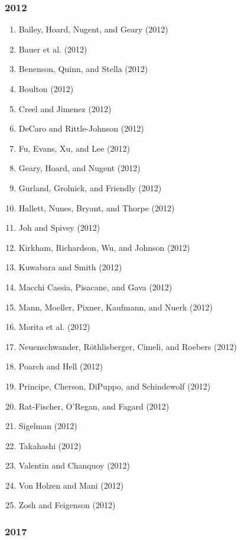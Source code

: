 \documentclass[english,man]{apa6}
\providecommand{\tightlist}{%
  \setlength{\itemsep}{0pt}\setlength{\parskip}{0pt}}
\begin{document}
\subsubsection{2012}\label{section-12}

\begin{enumerate}
\def\labelenumi{\arabic{enumi})}
\tightlist
\item
  Bailey, Hoard, Nugent, and Geary (2012)
\item
  Bauer et al. (2012)
\item
  Benenson, Quinn, and Stella (2012)
\item
  Boulton (2012)
\item
  Creel and Jimenez (2012)
\item
  DeCaro and Rittle-Johnson (2012)
\item
  Fu, Evans, Xu, and Lee (2012)
\item
  Geary, Hoard, and Nugent (2012)
\item
  Gurland, Grolnick, and Friendly (2012)
\item
  Hallett, Nunes, Bryant, and Thorpe (2012)
\item
  Joh and Spivey (2012)
\item
  Kirkham, Richardson, Wu, and Johnson (2012)
\item
  Kuwabara and Smith (2012)
\item
  Macchi Cassia, Pisacane, and Gava (2012)
\item
  Mann, Moeller, Pixner, Kaufmann, and Nuerk (2012)
\item
  Morita et al. (2012)
\item
  Neuenschwander, Röthlisberger, Cimeli, and Roebers (2012)
\item
  Poarch and Hell (2012)
\item
  Principe, Cherson, DiPuppo, and Schindewolf (2012)
\item
  Rat-Fischer, O'Regan, and Fagard (2012)
\item
  Sigelman (2012)
\item
  Takahashi (2012)
\item
  Valentin and Chanquoy (2012)
\item
  Von Holzen and Mani (2012)
\item
  Zosh and Feigenson (2012)
\end{enumerate}

\subsubsection{2017}\label{section-13}
\end{document}

